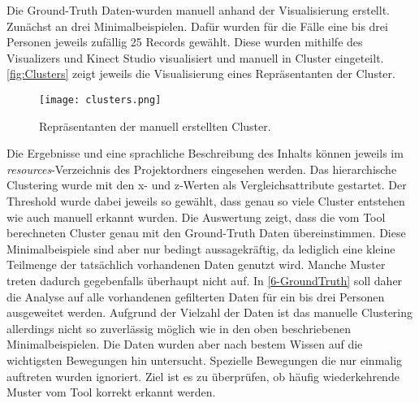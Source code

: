 Die Ground-Truth Daten-wurden manuell anhand der Visualisierung erstellt.
Zunächst an drei Minimalbeispielen.
Dafür wurden für die Fälle eine bis drei Personen jeweils zufällig 25 Records gewählt.
Diese wurden mithilfe des Visualizers und Kinect Studio visualisiert und manuell in Cluster eingeteilt.
\autoref{fig:Clusters} zeigt jeweils die Visualisierung eines Repräsentanten der Cluster.
\begin{figure}[ht]
    \begin{center}
    \texttt{[image: clusters.png]}
    \end{center}
    \caption{Repräsentanten der manuell erstellten Cluster.}
    \label{fig:Clusters}
\end{figure}
Die Ergebnisse und eine sprachliche Beschreibung des Inhalts
können jeweils im \emph{resources}-Verzeichnis des Projektordners eingesehen werden.
Das hierarchische Clustering wurde mit den x- und z-Werten als Vergleichsattribute gestartet.
Der Threshold wurde dabei jeweils so gewählt,
dass genau so viele Cluster entstehen wie auch manuell erkannt wurden.
Die Auswertung zeigt, dass die vom Tool berechneten Cluster genau mit den Ground-Truth Daten übereinstimmen.
Diese Minimalbeispiele sind aber nur bedingt aussagekräftig,
da lediglich eine kleine Teilmenge der tatsächlich vorhandenen Daten genutzt wird.
Manche Muster treten dadurch gegebenfalls überhaupt nicht auf.
In \autoref{6-GroundTruth} soll daher die Analyse auf alle vorhandenen gefilterten Daten
für ein bis drei Personen ausgeweitet werden.
Aufgrund der Vielzahl der Daten ist das manuelle Clustering allerdings nicht so
zuverlässig möglich wie in den oben beschriebenen Minimalbeispielen.
Die Daten wurden aber nach bestem Wissen auf die wichtigsten Bewegungen hin untersucht.
Spezielle Bewegungen die nur einmalig auftreten wurden ignoriert.
Ziel ist es zu überprüfen,
ob häufig wiederkehrende Muster vom Tool korrekt erkannt werden.

